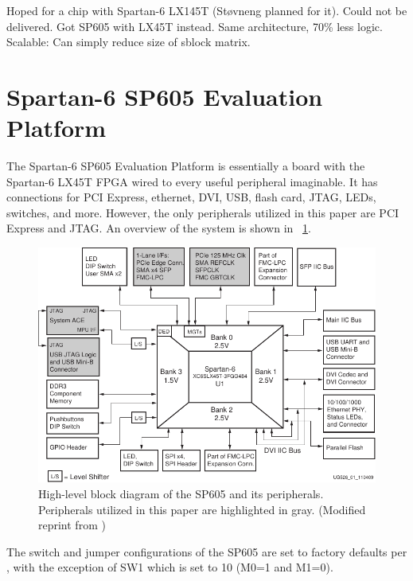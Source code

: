 \TODO
Hoped for a chip with Spartan-6 LX145T (Støvneng planned for it).
Could not be delivered.
Got SP605 with LX45T instead.
Same architecture, 70\% less logic.
Scalable: Can simply reduce size of sblock matrix.

\section{Spartan-6 SP605 Evaluation Platform}

The Spartan-6 SP605 Evaluation Platform is essentially a board with the Spartan-6 LX45T FPGA wired to every useful peripheral imaginable.
It has connections for PCI Express\footnotemark, ethernet, DVI, USB, flash card, JTAG, LEDs, switches, and more.
However, the only peripherals utilized in this paper are PCI Express and JTAG.
An overview of the system is shown in \figurename~\ref{fig:sp605}.


\begin{figure}[!ht]
    \centering
    \includegraphics[width=\textwidth]{figures/sp605-modified}
    \caption[SP605]{
        High-level block diagram of the SP605 and its peripherals.
        Peripherals utilized in this paper are highlighted in gray.
        (Modified reprint from \cite{ug526})
    }
    \label{fig:sp605}
\end{figure}

The switch and jumper configurations of the SP605 are set to factory defaults per \cite{ug526}, with the exception of SW1 which is set to 10 (M0=1 and M1=0).

